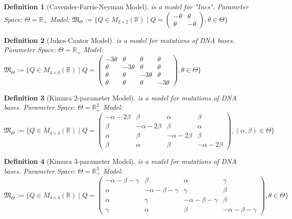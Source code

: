 \documentclass{article}
\newtheorem{definition}{Definition}
\begin{document}
\begin{definition}[Cavender-Farris-Neyman Model] is a model for "Ines".
Parameter Space: $ \Theta = \mathbb{R}_+  $
Model: $\mathfrak{M}_\Theta := \{ Q \in M_{2\times 2}(\mathbb{R}) \mid Q = \begin{pmatrix} -\theta & \theta \\ \theta & - \theta\end{pmatrix}, \theta \in \Theta \} $
\end{definition}

\begin{definition}[Jukes-Cantor Model] is a model for mutations of DNA bases.
Parameter Space: $ \Theta = \mathbb{R}_+  $
Model: $ \mathfrak{M}_\Theta := \{ Q \in M_{4\times 4}(\mathbb{R}) \mid Q = \begin{pmatrix} -3\theta & \theta & \theta & \theta \\ \theta & -3\theta & \theta & \theta \\ \theta & \theta & -3\theta & \theta\\ \theta & \theta & \theta & -3\theta\end{pmatrix}, \theta \in \Theta \} $
\end{definition}
\begin{definition}[Kimura 2-parameter Model] is a model for mutations of DNA bases.
Parameter Space: $ \Theta = \mathbb{R}^2_+  $
Model: $ \mathfrak{M}_\Theta := \{ Q \in M_{4\times 4}(\mathbb{R}) \mid Q = \begin{pmatrix} -\alpha-2\beta & \beta & \alpha & \beta \\ \beta & -\alpha-2\beta  & \beta & \alpha \\ \alpha & \beta & -\alpha-2\beta  & \beta\\ \beta & \alpha & \beta & -\alpha-2\beta \end{pmatrix}, (\alpha,\beta) \in \Theta \} $
\end{definition}

\begin{definition}[Kimura 3-parameter Model] is a model for mutations of DNA bases.
Parameter Space: $ \Theta = \mathbb{R}^3_+  $
Model: $ \mathfrak{M}_\Theta := \{ Q \in M_{4\times 4}(\mathbb{R}) \mid Q = \begin{pmatrix} -\alpha-\beta-\gamma & \beta & \alpha & \gamma \\ \alpha &  -\alpha-\beta-\gamma & \gamma & \beta \\ \alpha & \gamma & -\alpha-\beta-\gamma & \beta\\ \gamma & \alpha & \beta &  -\alpha-\beta-\gamma\end{pmatrix}, \theta \in \Theta \} $
\end{definition}
\end{document}
